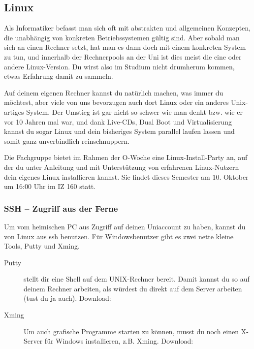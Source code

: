 

\subsection{Linux}
	\label{linux}
	Als Informatiker befasst man sich oft mit abstrakten und allgemeinen Konzepten, die unabhängig von konkreten Betriebssystemen gültig sind. Aber sobald man sich an einen Rechner setzt, hat man es dann doch mit einem konkreten System zu tun, und innerhalb der Rechnerpools an der Uni ist dies meist die eine oder andere Linux-Version. Du wirst also im Studium nicht drumherum kommen, etwas Erfahrung damit zu sammeln.

	Auf deinem eigenen Rechner kannst du natürlich machen, was immer du möchtest, aber viele von uns bevorzugen auch dort Linux oder ein anderes Unix-artiges System. Der Umstieg ist gar nicht so schwer wie man denkt bzw. wie er vor 10 Jahren mal war, und dank Live-CDs, Dual Boot und Virtualisierung kannst du sogar Linux und dein bisheriges System parallel laufen lassen und somit ganz unverbindlich reinschnuppern.

	Die Fachgruppe bietet im Rahmen der O-Woche eine Linux-Install-Party an, auf der du unter Anleitung und mit Unterstützung von erfahrenen Linux-Nutzern dein eigenes Linux installieren kannst. Sie findet dieses Semester am 10. Oktober um 16:00 Uhr im IZ 160 statt. 

	\subsubsection{SSH -- Zugriff aus der Ferne}
		Um vom heimischen PC aus Zugriff auf deinen Uniaccount zu haben, kannst du von Linux aus ssh benutzen. Für Windowsbenutzer gibt es zwei nette kleine Tools, Putty und Xming. %

		\begin{description}
			\item[Putty] stellt dir eine Shell auf dem UNIX-Rechner bereit. Damit kannst du so auf deinem Rechner arbeiten, als würdest du direkt auf dem Server arbeiten (tust du ja auch).  Download: 
			\item[Xming] Um auch grafische Programme starten zu können, musst du noch einen X-Server für Windows
			  installieren, z.B. Xming. Download: 
		\end{description}

